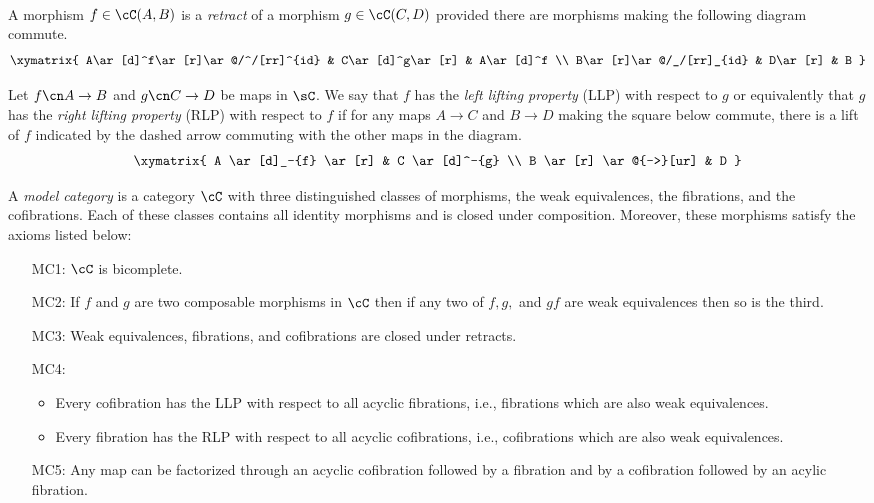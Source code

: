 \documentclass[leqno,oneside,english]{elsarticle}
\newcounter{enumisaved}
\newlength{\thmsaved}
\begin{document}
{{    {}  \ifshowcomplete
  \ 
  {
\begin{defn*}\label{def:retract}
  A morphism $f\in \cC(A,B)$ is a {\em{retract}} of a morphism
  $g\in \cC(C,D)$ provided there are morphisms making the following
  diagram commute.
  \[\xymatrix{
  A\ar[d]^f\ar[r]\ar@/^/[rr]^{id} & C\ar[d]^g\ar[r] & A\ar[d]^f \\
  B\ar[r]\ar@/_/[rr]_{id} & D\ar[r] & B 
  }\]
\end{defn*}

\begin{defn*}
  Let $f \cn A \to B$ and $g \cn C \to D$ be maps in $\sC$.  We say
  that $f$ has the \emph{left lifting property} (LLP) with respect to
  $g$ or equivalently that $g$ has the \emph{right lifting property}
  (RLP) with respect to $f$ if for any maps $A \to C$ and $B \to D$
  making the square below commute, there is a lift of $f$ indicated by
  the dashed arrow commuting with the other maps in the diagram.
  \[\xymatrix{
    A \ar[d]_-{f} \ar[r] & C \ar[d]^-{g} \\
    B \ar[r] \ar@{-->}[ur] & D
  }\]
\end{defn*}

\begin{defn*}\label{def:model-category}
  A {\em{model category}} is a category $\cC$ with three distinguished
  classes of morphisms, the weak equivalences, the fibrations, and the
  cofibrations. Each of these classes contains all identity morphisms
  and is closed under composition. Moreover, these morphisms satisfy
  the axioms listed below:
  \begin{itemize}
	\item[MC1:]\label{it:MC1} $\cC$ is bicomplete.
  	\item[MC2:] If $f$ and $g$ are two composable morphisms in $\cC$
	  then if any two of $f, g,$ and $gf$ are weak equivalences then so
	  is the third.
	\item[MC3:] Weak equivalences, fibrations, and cofibrations are
	  closed under retracts.
	\item[MC4:] \begin{itemize}
		\item Every cofibration has the LLP with respect to all acyclic
		  fibrations, i.e., fibrations which are also weak equivalences.
		\item Every fibration has the RLP with respect to all acyclic
		  cofibrations, i.e., cofibrations which are also weak
		  equivalences.
	  \end{itemize}
	\item[MC5:]\label{it:MC5} Any map can be factorized through an
	  acyclic cofibration followed by a fibration and by a cofibration
	  followed by an acylic fibration.
  \end{itemize}
\end{defn*}

}}}
\end{document}
